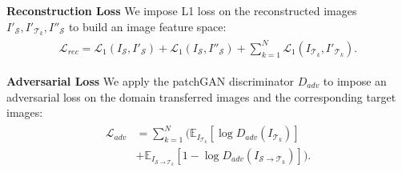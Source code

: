 \noindent\textbf{Reconstruction Loss} 
We impose L1 loss on the reconstructed images $I'_\mathcal{S}, I'_{\mathcal{T}_k}, I''_\mathcal{S}$ to build an image feature space: 
\begin{gather}
\begin{split}
\mathcal{L}_{rec} = \mathcal{L}_1(I_\mathcal{S}, I'_\mathcal{S}) + \mathcal{L}_1(I_\mathcal{S}, I''_\mathcal{S}) + \sum_{k=1}^N \mathcal{L}_1(I_{\mathcal{T}_k}, I'_{\mathcal{T}_k}).
\end{split}
\label{eq:rec}
\end{gather}

\noindent\textbf{Adversarial Loss}
We apply the patchGAN \cite{isola2017image} discriminator $D_{adv}$ to impose an adversarial loss on the domain transferred images and the corresponding target images:
\begin{gather}
\begin{split}
    \mathcal{L}_{adv}
    & = \sum_{k=1}^{N} \Big( \mathbb{E}_{I_{\mathcal{T}_k}} \left[ \log D_{adv}(I_{\mathcal{T}_k}) \right] \\
    &+ \mathbb{E}_{I_{\mathcal{S}\to {\mathcal{T}_k}}} \left[1 - \log D_{adv}(I_{\mathcal{S}\to {\mathcal{T}_k}}) \right] \Big). \\
\end{split}
\label{eq:adv}
\end{gather}

